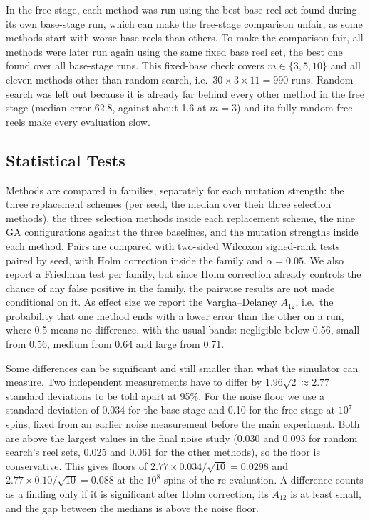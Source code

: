 In the free stage, each method was run using the best base reel set found during its own base-stage run, which can make the free-stage comparison unfair, as some methods start with worse base reels than others. To make the comparison fair, all methods were later run again using the same fixed base reel set, the best one found over all base-stage runs. This fixed-base check covers $m \in \{3, 5, 10\}$ and all eleven methods other than random search, i.e.\ $30 \times 3 \times 11 = 990$ runs. Random search was left out because it is already far behind every other method in the free stage (median error 62.8, against about 1.6 at $m = 3$) and its fully random free reels make every evaluation slow.

\subsection{Statistical Tests}
\label{sec:stats}

Methods are compared in families, separately for each mutation strength: the three replacement schemes (per seed, the median over their three selection methods), the three selection methods inside each replacement scheme, the nine GA configurations against the three baselines, and the mutation strengths inside each method. Pairs are compared with two-sided Wilcoxon signed-rank tests paired by seed, with Holm correction inside the family and $\alpha = 0.05$. We also report a Friedman test per family, but since Holm correction already controls the chance of any false positive in the family, the pairwise results are not made conditional on it. As effect size we report the Vargha--Delaney $A_{12}$, i.e.\ the probability that one method ends with a lower error than the other on a run, where 0.5 means no difference, with the usual bands: negligible below 0.56, small from 0.56, medium from 0.64 and large from 0.71.

Some differences can be significant and still smaller than what the simulator can measure. Two independent measurements have to differ by $1.96\sqrt{2} \approx 2.77$ standard deviations to be told apart at 95\%. For the noise floor we use a standard deviation of 0.034 for the base stage and 0.10 for the free stage at $10^7$ spins, fixed from an earlier noise measurement before the main experiment. Both are above the largest values in the final noise study (0.030 and 0.093 for random search's reel sets, 0.025 and 0.061 for the other methods), so the floor is conservative. This gives floors of $2.77 \times 0.034/\sqrt{10} = 0.0298$ and $2.77 \times 0.10/\sqrt{10} = 0.088$ at the $10^8$ spins of the re-evaluation. A difference counts as a finding only if it is significant after Holm correction, its $A_{12}$ is at least small, and the gap between the medians is above the noise floor.

